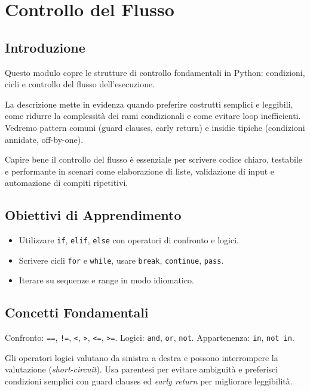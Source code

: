 \chapter{Controllo del Flusso}
\label{chap:controllo-flusso}

\section{Introduzione}
\label{sec:cf-introduzione}
Questo modulo copre le strutture di controllo fondamentali in Python: condizioni, cicli e controllo del flusso dell'esecuzione.

La descrizione mette in evidenza quando preferire costrutti semplici e leggibili, come ridurre la complessità dei rami condizionali e come evitare loop inefficienti. Vedremo pattern comuni (guard clauses, early return) e insidie tipiche (condizioni annidate, off-by-one).

Capire bene il controllo del flusso è essenziale per scrivere codice chiaro, testabile e performante in scenari come elaborazione di liste, validazione di input e automazione di compiti ripetitivi.

\section{Obiettivi di Apprendimento}
\label{sec:cf-obiettivi}
\begin{itemize}
  \item Utilizzare \texttt{if}, \texttt{elif}, \texttt{else} con operatori di confronto e logici.
  \item Scrivere cicli \texttt{for} e \texttt{while}, usare \texttt{break}, \texttt{continue}, \texttt{pass}.
  \item Iterare su sequenze e range in modo idiomatico.
\end{itemize}

\section{Concetti Fondamentali}
\label{sec:cf-concetti}
\begin{tcolorbox}[title=Operatori]
Confronto: \texttt{==}, \texttt{!=}, \texttt{<}, \texttt{>}, \texttt{<=}, \texttt{>=}. Logici: \texttt{and}, \texttt{or}, \texttt{not}. Appartenenza: \texttt{in}, \texttt{not in}.
\end{tcolorbox}

\begin{tcolorbox}[title=Precedenza e short-circuit]
Gli operatori logici valutano da sinistra a destra e possono interrompere la valutazione (\emph{short-circuit}).
Usa parentesi per evitare ambiguità e preferisci condizioni semplici con guard clauses ed \emph{early return} per migliorare leggibilità.
\end{tcolorbox}

